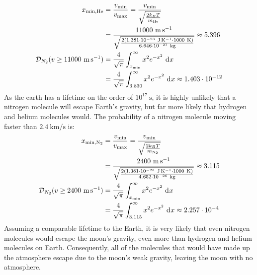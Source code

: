\documentclass{article}
\begin{document}
\begin{equation}
    \begin{split}
        x_{\text{min},\ce{He}} & = \frac{v_{\text{min}}}{v_{\text{max}}} = \frac{v_{\text{min}}}{\sqrt{\frac{2k_BT}{m_{\ce{He}}}}} \\
        & = \frac{11000~\unit{\meter\per\second}}{\sqrt{\frac{2\left(1.381 \cdot 10^{-23}~\unit{\joule\per\kelvin} \cdot 1000~\unit{\kelvin}\right)}{6.646 \cdot 10^{-27}~\unit{\kilo\gram}}}} \approx 5.396 \\
        \mathcal{D}_{N_2}(v \geq 11000~\unit{\meter\per\second}) & = \frac{4}{\sqrt{\pi}}\int_{x_{\text{min}}}^{\infty} x^2 e^{-x^2} \, \diff{x} \\
        & = \frac{4}{\sqrt{\pi}}\int_{3.830}^{\infty} x^2 e^{-x^2} \, \diff{x} \approx 1.403 \cdot 10^{-12} \\
    \end{split}
\end{equation}
As the earth has a lifetime on the order of $10^{17}~\unit{\second}$, it is highly unlikely that a nitrogen molecule will escape Earth's gravity, but far more likely that hydrogen and helium molecules would.
The probability of a nitrogen molecule moving faster than $2.4~\unit{\kilo\meter\per\second}$ is:
\begin{equation}
    \begin{split}
        x_{\text{min},\ce{N2}} & = \frac{v_{\text{min}}}{v_{\text{max}}} = \frac{v_{\text{min}}}{\sqrt{\frac{2k_BT}{m_{\ce{N2}}}}} \\
        & = \frac{2400~\unit{\meter\per\second}}{\sqrt{\frac{2\left(1.381 \cdot 10^{-23}~\unit{\joule\per\kelvin} \cdot 1000~\unit{\kelvin}\right)}{4.652 \cdot 10^{-26}~\unit{\kilo\gram}}}} \approx 3.115 \\
        \mathcal{D}_{N_2}(v \geq 2400~\unit{\meter\per\second}) & = \frac{4}{\sqrt{\pi}}\int_{x_{\text{min}}}^{\infty} x^2 e^{-x^2} \, \diff{x} \\
        & = \frac{4}{\sqrt{\pi}}\int_{3.115}^{\infty} x^2 e^{-x^2} \, \diff{x} \approx 2.257 \cdot 10^{-4} \\
    \end{split}
\end{equation}
Assuming a comparable lifetime to the Earth, it is very likely that even nitrogen molecules would escape the moon's gravity, even more than hydrogen and helium molecules on Earth. Consequently, all of the molecules that would have made up the atmosphere escape due to the moon's weak gravity, leaving the moon with no atmosphere.
\end{document}

